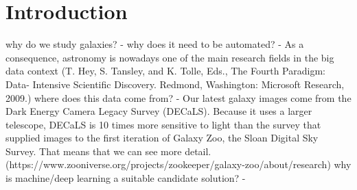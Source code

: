 \section{Introduction}


why do we study galaxies?
  -
why does it need to be automated?
  - As a consequence, astronomy is nowadays one of the main research fields in the big data context (T. Hey, S. Tansley, and K. Tolle, Eds., The Fourth Paradigm: Data- Intensive Scientific Discovery. Redmond, Washington: Microsoft Research, 2009.)
where does this data come from?
  - Our latest galaxy images come from the Dark Energy Camera Legacy Survey (DECaLS). Because it uses a larger telescope, DECaLS is 10 times more sensitive to light than the survey that supplied images to the first iteration of Galaxy Zoo, the Sloan Digital Sky Survey. That means that we can see more detail. (https://www.zooniverse.org/projects/zookeeper/galaxy-zoo/about/research)
why is machine/deep learning a suitable candidate solution?
  -
